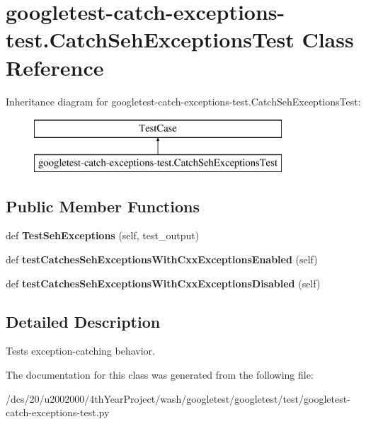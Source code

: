\hypertarget{classgoogletest-catch-exceptions-test_1_1CatchSehExceptionsTest}{}\section{googletest-\/catch-\/exceptions-\/test.Catch\+Seh\+Exceptions\+Test Class Reference}
\label{classgoogletest-catch-exceptions-test_1_1CatchSehExceptionsTest}
Inheritance diagram for googletest-\/catch-\/exceptions-\/test.Catch\+Seh\+Exceptions\+Test\+:\begin{figure}[H]
\begin{center}
\leavevmode
\includegraphics[height=2.000000cm]{classgoogletest-catch-exceptions-test_1_1CatchSehExceptionsTest}
\end{center}
\end{figure}
\subsection*{Public Member Functions}
\begin{DoxyCompactItemize}
\item 
\mbox{\label{classgoogletest-catch-exceptions-test_1_1CatchSehExceptionsTest_a86d5639a464b9ee5e05816758bd1ae1f}} 
def {\bfseries Test\+Seh\+Exceptions} (self, test\+\_\+output)
\item 
\mbox{\label{classgoogletest-catch-exceptions-test_1_1CatchSehExceptionsTest_abfb6b8448b7af79621f6f663e40ebca3}} 
def {\bfseries test\+Catches\+Seh\+Exceptions\+With\+Cxx\+Exceptions\+Enabled} (self)
\item 
\mbox{\label{classgoogletest-catch-exceptions-test_1_1CatchSehExceptionsTest_a8e448244058ea16b0ba3148678c0b9e6}} 
def {\bfseries test\+Catches\+Seh\+Exceptions\+With\+Cxx\+Exceptions\+Disabled} (self)
\end{DoxyCompactItemize}


\subsection{Detailed Description}
\begin{DoxyVerb}Tests exception-catching behavior.\end{DoxyVerb}
 

The documentation for this class was generated from the following file\+:\begin{DoxyCompactItemize}
\item 
/dcs/20/u2002000/4th\+Year\+Project/wash/googletest/googletest/test/googletest-\/catch-\/exceptions-\/test.\+py\end{DoxyCompactItemize}
